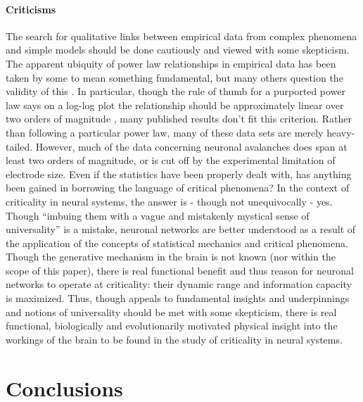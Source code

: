 \documentclass[12pt]{article}
\begin{document}
\paragraph{Criticisms} The search for qualitative links between empirical data from complex phenomena and simple models should be done cautiously and viewed with some skepticism. The apparent ubiquity of power law relationships in empirical data has been taken by some \cite{Bak1987a} to mean something fundamental, but many others question the validity of this \cite{Stumpf2012a}. In particular, though the rule of thumb for a purported power law says on a log-log plot the relationship should be approximately linear over two orders of magnitude \cite{Sethna2011a}, many published results don't fit this criterion. Rather than following a particular power law, many of these data sets are merely heavy-tailed. However, much of the data concerning neuronal avalanches does span at least two orders of magnitude, or is cut off by the experimental limitation of electrode size. Even if the statistics have been properly dealt with, has anything been gained in borrowing the language of critical phenomena? In the context of criticality in neural systems, the answer is - though not unequivocally - yes. Though ``imbuing them with a vague and mistakenly mystical sense of universality'' \cite{Stumpf2012a} is a mistake, neuronal networks are better understood as a result of the application of the concepts of statistical mechanics and critical phenomena. Though the generative mechanism in the brain is not known (nor within the scope of this paper), there is real functional benefit and thus reason for neuronal networks to operate at criticality: their dynamic range and information capacity is maximized. Thus, though appeals to fundamental insights and underpinnings and notions of universality should be met with some skepticism, there is real functional, biologically and evolutionarily motivated physical insight into the workings of the brain to be found in the study of criticality in neural systems.

\section*{Conclusions}
\end{document}
